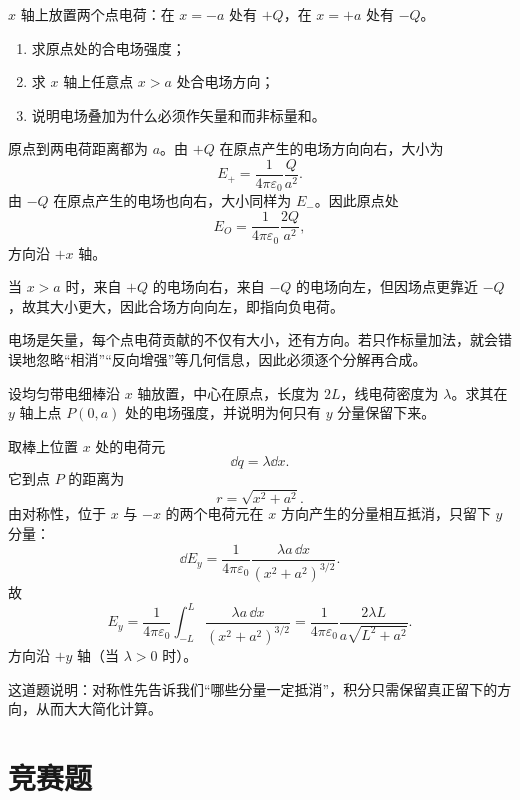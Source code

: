 \begin{classic}
$x$ 轴上放置两个点电荷：在 $x=-a$ 处有 $+Q$，在 $x=+a$ 处有 $-Q$。
\begin{enumerate}
  \item 求原点处的合电场强度；
  \item 求 $x$ 轴上任意点 $x>a$ 处合电场方向；
  \item 说明电场叠加为什么必须作矢量和而非标量和。
\end{enumerate}
\begin{solution}
原点到两电荷距离都为 $a$。由 $+Q$ 在原点产生的电场方向向右，大小为
\[
E_+=\frac{1}{4\pi\varepsilon_0}\frac{Q}{a^2}.
\]
由 $-Q$ 在原点产生的电场也向右，大小同样为 $E_-$。因此原点处
\[
E_O=\frac{1}{4\pi\varepsilon_0}\frac{2Q}{a^2},
\]
方向沿 $+x$ 轴。

当 $x>a$ 时，来自 $+Q$ 的电场向右，来自 $-Q$ 的电场向左，但因场点更靠近 $-Q$，故其大小更大，因此合场方向向左，即指向负电荷。

电场是矢量，每个点电荷贡献的不仅有大小，还有方向。若只作标量加法，就会错误地忽略“相消”“反向增强”等几何信息，因此必须逐个分解再合成。
\end{solution}
\end{classic}

\begin{classic}
设均匀带电细棒沿 $x$ 轴放置，中心在原点，长度为 $2L$，线电荷密度为 $\lambda$。求其在 $y$ 轴上点 $P(0,a)$ 处的电场强度，并说明为何只有 $y$ 分量保留下来。
\begin{solution}
取棒上位置 $x$ 处的电荷元
\[
\dd q=\lambda\dd x.
\]
它到点 $P$ 的距离为
\[
r=\sqrt{x^2+a^2}.
\]
由对称性，位于 $x$ 与 $-x$ 的两个电荷元在 $x$ 方向产生的分量相互抵消，只留下 $y$ 分量：
\[
\dd E_y=\frac{1}{4\pi\varepsilon_0}\frac{\lambda a\,\dd x}{(x^2+a^2)^{3/2}}.
\]
故
\[
E_y=\frac{1}{4\pi\varepsilon_0}\int_{-L}^{L}\frac{\lambda a\,\dd x}{(x^2+a^2)^{3/2}}
=\frac{1}{4\pi\varepsilon_0}\frac{2\lambda L}{a\sqrt{L^2+a^2}}.
\]
方向沿 $+y$ 轴（当 $\lambda>0$ 时）。

这道题说明：对称性先告诉我们“哪些分量一定抵消”，积分只需保留真正留下的方向，从而大大简化计算。
\end{solution}
\end{classic}

\section{竞赛题}

